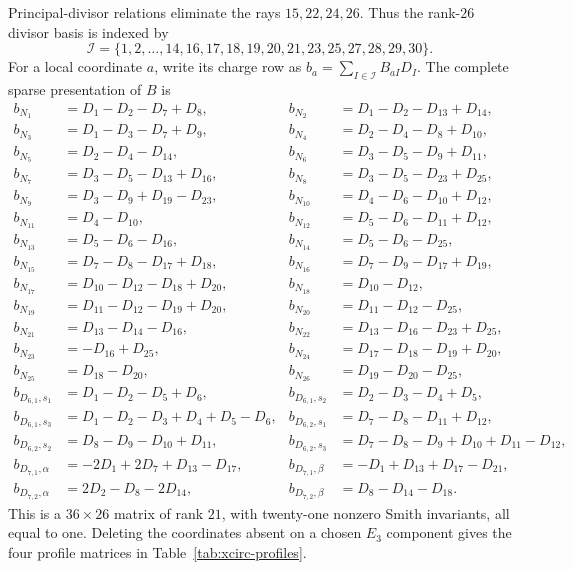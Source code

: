 Principal-divisor relations eliminate the rays $15,22,24,26$. Thus the
rank-$26$ divisor basis is indexed by
\begin{equation}
 \mathcal I=
 \{1,2,\ldots,14,16,17,18,19,20,21,23,25,27,28,29,30\}.
 \label{eq:app-xcirc-index}
\end{equation}
For a local coordinate $a$, write its charge row as
$b_a=\sum_{I\in\mathcal I}B_{aI}D_I$. The complete sparse presentation of
$B$ is
\begingroup
\scriptsize
\begin{align*}
b_{N_1}&=D_1-D_2-D_7+D_8,&
b_{N_2}&=D_1-D_2-D_{13}+D_{14},\\
b_{N_3}&=D_1-D_3-D_7+D_9,&
b_{N_4}&=D_2-D_4-D_8+D_{10},\\
b_{N_5}&=D_2-D_4-D_{14},&
b_{N_6}&=D_3-D_5-D_9+D_{11},\\
b_{N_7}&=D_3-D_5-D_{13}+D_{16},&
b_{N_8}&=D_3-D_5-D_{23}+D_{25},\\
b_{N_9}&=D_3-D_9+D_{19}-D_{23},&
b_{N_{10}}&=D_4-D_6-D_{10}+D_{12},\\
b_{N_{11}}&=D_4-D_{10},&
b_{N_{12}}&=D_5-D_6-D_{11}+D_{12},\\
b_{N_{13}}&=D_5-D_6-D_{16},&
b_{N_{14}}&=D_5-D_6-D_{25},\\
b_{N_{15}}&=D_7-D_8-D_{17}+D_{18},&
b_{N_{16}}&=D_7-D_9-D_{17}+D_{19},\\
b_{N_{17}}&=D_{10}-D_{12}-D_{18}+D_{20},&
b_{N_{18}}&=D_{10}-D_{12},\\
b_{N_{19}}&=D_{11}-D_{12}-D_{19}+D_{20},&
b_{N_{20}}&=D_{11}-D_{12}-D_{25},\\
b_{N_{21}}&=D_{13}-D_{14}-D_{16},&
b_{N_{22}}&=D_{13}-D_{16}-D_{23}+D_{25},\\
b_{N_{23}}&=-D_{16}+D_{25},&
b_{N_{24}}&=D_{17}-D_{18}-D_{19}+D_{20},\\
b_{N_{25}}&=D_{18}-D_{20},&
b_{N_{26}}&=D_{19}-D_{20}-D_{25},\\
b_{D_{6,1},s_1}&=D_1-D_2-D_5+D_6,&
b_{D_{6,1},s_2}&=D_2-D_3-D_4+D_5,\\
b_{D_{6,1},s_3}&=D_1-D_2-D_3+D_4+D_5-D_6,&
b_{D_{6,2},s_1}&=D_7-D_8-D_{11}+D_{12},\\
b_{D_{6,2},s_2}&=D_8-D_9-D_{10}+D_{11},&
b_{D_{6,2},s_3}&=D_7-D_8-D_9+D_{10}+D_{11}-D_{12},\\
b_{D_{7,1},\alpha}&=-2D_1+2D_7+D_{13}-D_{17},&
b_{D_{7,1},\beta}&=-D_1+D_{13}+D_{17}-D_{21},\\
b_{D_{7,2},\alpha}&=2D_2-D_8-2D_{14},&
b_{D_{7,2},\beta}&=D_8-D_{14}-D_{18}.
\end{align*}
\endgroup
This is a $36\times26$ matrix of rank $21$, with twenty-one nonzero Smith
invariants, all equal to one. Deleting the coordinates absent on a chosen
$E_3$ component gives the four profile matrices in
Table~\ref{tab:xcirc-profiles}.

